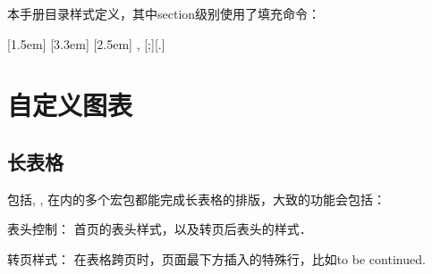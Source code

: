 本手册目录样式定义，其中section级别使用了填充命令：
\begin{latex}
[1.5em]{}{\contentslabel{1.5em}}
    {\hspace*{-2em}}{\hfill\contentspage}
[3.3em]{}
    {\contentslabel{1.8em}}{\hspace*{-2.3em}}
    {\titlerule*[8pt]{$\cdot$}\contentspage}
[2.5em]{\small}
    {\thecontentslabel{}}{}
    {, \thecontentspage}[;\qquad][.]
\end{latex}

\section{自定义图表}
\label{sec:figtab}
\subsection{长表格}
包括, , 在内的多个宏包都能完成长表格的排版，大致的功能会包括：
\begin{para}
\item[表头控制：] 首页的表头样式，以及转页后表头的样式．
\item[转页样式：] 在表格跨页时，页面最下方插入的特殊行，比如to be continued.
\end{para}

